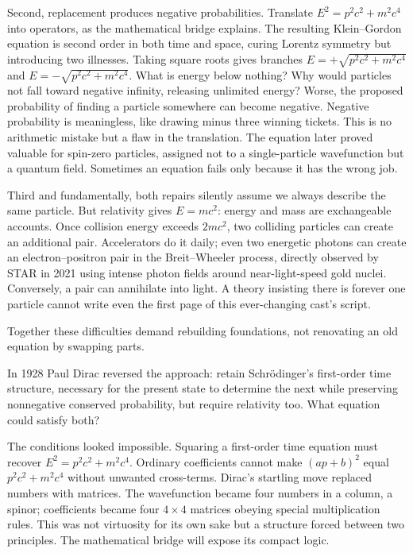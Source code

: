 Second, replacement produces negative probabilities. Translate \(E^2=p^2c^2+m^2c^4\) into operators, as the mathematical bridge explains. The resulting Klein--Gordon equation is second order in both time and space, curing Lorentz symmetry but introducing two illnesses. Taking square roots gives branches \(E=+\sqrt{p^2c^2+m^2c^4}\) and \(E=-\sqrt{p^2c^2+m^2c^4}\). What is energy below nothing? Why would particles not fall toward negative infinity, releasing unlimited energy? Worse, the proposed probability of finding a particle somewhere can become negative. Negative probability is meaningless, like drawing minus three winning tickets. This is no arithmetic mistake but a flaw in the translation. The equation later proved valuable for spin-zero particles, assigned not to a single-particle wavefunction but a quantum field. Sometimes an equation fails only because it has the wrong job.

Third and fundamentally, both repairs silently assume we always describe the same particle. But relativity gives \(E=mc^2\): energy and mass are exchangeable accounts. Once collision energy exceeds \(2mc^2\), two colliding particles can create an additional pair. Accelerators do it daily; even two energetic photons can create an electron--positron pair in the Breit--Wheeler process, directly observed by STAR in 2021 using intense photon fields around near-light-speed gold nuclei. Conversely, a pair can annihilate into light. A theory insisting there is forever one particle cannot write even the first page of this ever-changing cast's script.

Together these difficulties demand rebuilding foundations, not renovating an old equation by swapping parts.


In 1928 Paul Dirac reversed the approach: retain Schrödinger's first-order time structure, necessary for the present state to determine the next while preserving nonnegative conserved probability, but require relativity too. What equation could satisfy both?

The conditions looked impossible. Squaring a first-order time equation must recover \(E^2=p^2c^2+m^2c^4\). Ordinary coefficients cannot make \((ap+b)^2\) equal \(p^2c^2+m^2c^4\) without unwanted cross-terms. Dirac's startling move replaced numbers with matrices. The wavefunction became four numbers in a column, a spinor; coefficients became four \(4\times4\) matrices obeying special multiplication rules. This was not virtuosity for its own sake but a structure forced between two principles. The mathematical bridge will expose its compact logic.

